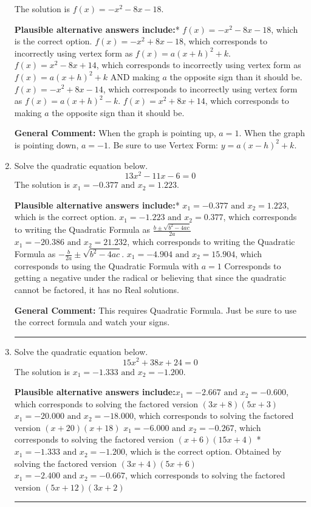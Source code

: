\documentclass{extbook}[14pt]
\newcommand{\litem}[1]{\item #1

\rule{\textwidth}{0.4pt}}
\begin{document}
\begin{enumerate}
{The solution is \( f(x) = -x^{2} -8 x -18 \).\begin{enumerate}[label=\Alph*.]
\textbf{Plausible alternative answers include:}* $f(x)=-x^{2} -8 x -18$, which is the correct option.
$f(x)=-x^{2} +8 x -18$, which corresponds to incorrectly using vertex form as $f(x) = a(x+h)^2+k$.
$f(x)=x^{2} -8 x + 14$, which corresponds to incorrectly using vertex form as $f(x) = a(x+h)^2+k$ AND making $a$ the opposite sign than it should be.
$f(x)=-x^{2} +8 x -14$, which corresponds to incorrectly using vertex form as $f(x) = a(x+h)^2 - k$.
$f(x)=x^{2} +8 x + 14$, which corresponds to making $a$ the opposite sign than it should be.
\end{enumerate}

\textbf{General Comment:} When the graph is pointing up, $a=1$. When the graph is pointing down, $a=-1$. Be sure to use Vertex Form: $y = a(x-h)^2+k$.
}
\litem{
Solve the quadratic equation below.
\[ 13x^{2} -11 x -6 = 0 \]The solution is \( x_1 = -0.377 \text{ and } x_2 = 1.223 \).\begin{enumerate}[label=\Alph*.]
\textbf{Plausible alternative answers include:}* $x_1 = -0.377 \text{ and } x_2 = 1.223$, which is the correct option.
 $x_1 = -1.223 \text{ and } x_2 = 0.377$, which corresponds to writing the Quadratic Formula as $\frac{b \pm \sqrt{b^2 - 4ac}}{2a}$
 $x_1 = -20.386 \text{ and } x_2 = 21.232$, which corresponds to writing the Quadratic Formula as $-\frac{b}{2a} \pm \sqrt{b^2 - 4ac}$.
 $x_1 = -4.904 \text{ and } x_2 = 15.904$, which corresponds to using the Quadratic Formula with $a=1$
Corresponds to getting a negative under the radical or believing that since the quadratic cannot be factored, it has no Real solutions.
\end{enumerate}

\textbf{General Comment:} This requires Quadratic Formula. Just be sure to use the correct formula and watch your signs.
}
\litem{
Solve the quadratic equation below.
\[ 15x^{2} +38 x + 24 = 0 \]The solution is \( x_1 = -1.333 \text{ and } x_2 = -1.200 \).\begin{enumerate}[label=\Alph*.]
\textbf{Plausible alternative answers include:}$x_1 = -2.667 \text{ and } x_2 = -0.600$, which corresponds to solving the factored version $(3x + 8)(5x + 3)$
$x_1 = -20.000 \text{ and } x_2 = -18.000$, which corresponds to solving the factored version $(x + 20)(x + 18)$
$x_1 = -6.000 \text{ and } x_2 = -0.267$, which corresponds to solving the factored version $(x + 6)(15x + 4)$
* $x_1 = -1.333 \text{ and } x_2 = -1.200$, which is the correct option. Obtained by solving the factored version $(3x + 4)(5x + 6)$
$x_1 = -2.400 \text{ and } x_2 = -0.667$, which corresponds to solving the factored version $(5x + 12)(3x + 2)$
\end{enumerate}

}
\end{enumerate}
\end{document}
